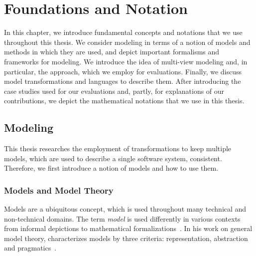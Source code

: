 \chapter{Foundations and Notation
}
\label{chap:foundations}

In this chapter, we introduce fundamental concepts and notations that we use throughout this thesis.
We consider modeling in terms of a notion of models and methods in which they are used, and depict important formalisms and frameworks for modeling.
We introduce the idea of multi-view modeling and, in particular, the \vitruv approach, which we employ for evaluations.
Finally, we discuss model transformations and languages to describe them.
After introducing the case studies used for our evaluations and, partly, for explanations of our contributions, we depict the mathematical notations that we use in this thesis.


\section{Modeling}
\label{chap:foundations:modeling}

This thesis researches the employment of transformations to keep multiple models, which are used to describe a single software system, consistent.
Therefore, we first introduce a notion of models and how to use them.


\subsection{Models and Model Theory}
\label{chap:foundations:modeling:models}

Models are a ubiquitous concept, which is used throughout many technical and non-technical domains.
The term \emph{model} is used differently in various contexts from informal depictions to mathematical formalizations~\cite{stachowiak1973modelltheorie-Book}.
In his work on general model theory, \citeauthor{stachowiak1973modelltheorie-Book} characterizes models by three criteria: representation, abstraction and pragmatics~\cite[p.~131--133]{stachowiak1973modelltheorie-Book}.

